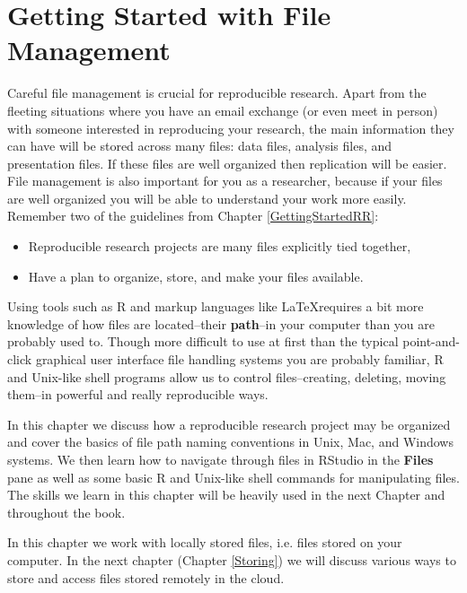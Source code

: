 



\chapter{Getting Started with File Management}\label{DirectoriesChapter}

Careful file management is crucial for reproducible research. Apart from the fleeting situations where you have an email exchange (or even meet in person) with someone interested in reproducing your research, the main information they can have will be stored across many files: data files, analysis files, and presentation files. If these files are well organized then replication will be easier. File management is also important for you as a researcher, because if your files are well organized you will be able to understand your work more easily. Remember two of the guidelines from Chapter \ref{GettingStartedRR}:

\begin{itemize}
    \item Reproducible research projects are many files explicitly tied together,
    \item Have a plan to organize, store, and make your files available. 
\end{itemize}

Using tools such as R and markup languages like \LaTeX requires a bit more knowledge of how files are located--their {\bf{path}}--in your computer than you are probably used to. Though more difficult to use at first than the typical point-and-click graphical user interface file handling systems you are probably familiar, R and Unix-like shell programs allow us to control files--creating, deleting, moving them--in powerful and really reproducible ways. 

In this chapter we discuss how a reproducible research project may be organized and cover the basics of file path naming conventions in Unix, Mac, and Windows systems. We then learn how to navigate through files in RStudio in the {\bf{Files}} pane as well as some basic R and Unix-like shell commands for manipulating files. The skills we learn in this chapter will be heavily used in the next Chapter and throughout the book.

In this chapter we work with locally stored files, i.e. files stored on your computer. In the next chapter (Chapter \ref{Storing}) we will discuss various ways to store and access files stored remotely in the cloud.

